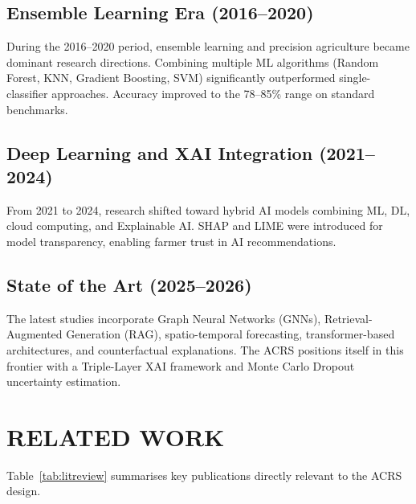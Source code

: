 \documentclass[12pt,a4paper,oneside]{report}
\begin{document}
\subsection{Ensemble Learning Era (2016--2020)}
During the 2016--2020 period, ensemble learning and precision agriculture became dominant research directions. Combining multiple ML algorithms (Random Forest, KNN, Gradient Boosting, SVM) significantly outperformed single-classifier approaches. Accuracy improved to the 78--85\% range on standard benchmarks.

\subsection{Deep Learning and XAI Integration (2021--2024)}
From 2021 to 2024, research shifted toward hybrid AI models combining ML, DL, cloud computing, and Explainable AI. SHAP and LIME were introduced for model transparency, enabling farmer trust in AI recommendations.

\subsection{State of the Art (2025--2026)}
The latest studies incorporate Graph Neural Networks (GNNs), Retrieval-Augmented Generation (RAG), spatio-temporal forecasting, transformer-based architectures, and counterfactual explanations. The ACRS positions itself in this frontier with a Triple-Layer XAI framework and Monte Carlo Dropout uncertainty estimation.

\section{RELATED WORK}

Table~\ref{tab:litreview} summarises key publications directly relevant to the ACRS design.
\end{document}
